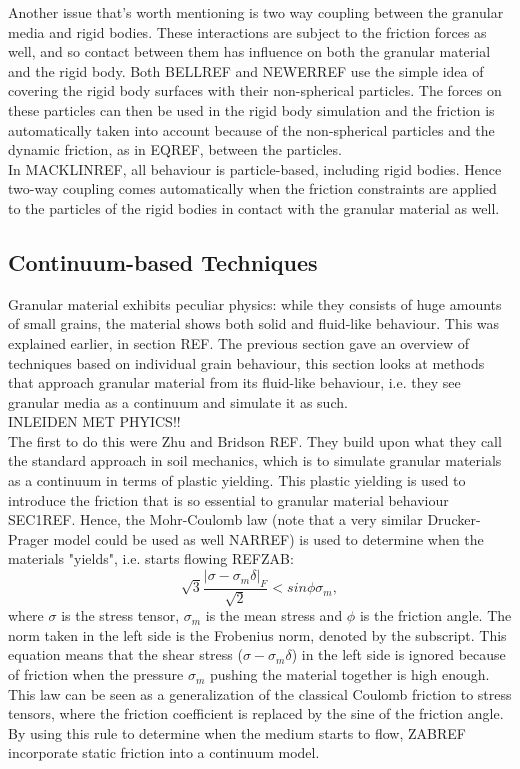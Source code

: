 Another issue that's worth mentioning is two way coupling between the granular media and rigid bodies. These interactions are subject to the friction forces as well, and so contact between them has influence on both the granular material and the rigid body. Both BELLREF and NEWERREF use the simple idea of covering the rigid body surfaces with their non-spherical particles. The forces on these particles can then be used in the rigid body simulation and the friction is automatically taken into account because of the non-spherical particles and the dynamic friction, as in EQREF, between the particles.\\

In MACKLINREF, all behaviour is particle-based, including rigid bodies. Hence two-way coupling comes automatically when the friction constraints are applied to the particles of the rigid bodies in contact with the granular material as well.


\subsection{Continuum-based Techniques}
Granular material exhibits peculiar physics: while they consists of huge amounts of small grains, the material shows both solid and fluid-like behaviour. This was explained earlier, in section REF. The previous section gave an overview of techniques based on individual grain behaviour, this section looks at methods that approach granular material from its fluid-like behaviour, i.e. they see granular media as a continuum and simulate it as such.\\

INLEIDEN MET PHYICS!!\\

The first to do this were Zhu and Bridson REF. They build upon what they call the standard approach in soil mechanics, which is to simulate granular materials as a continuum in terms of plastic yielding. This plastic yielding is used to introduce the friction that is so essential to granular material behaviour SEC1REF. Hence, the Mohr-Coulomb law (note that a very similar Drucker-Prager model could be used as well NARREF) is used to determine when the materials "yields", i.e. starts flowing REFZAB:
\begin{equation}
\sqrt{3} \frac{|\sigma - \sigma_m \delta |_F}{\sqrt{2}} < sin \phi \sigma_m,
\end{equation}
where $\sigma$ is the stress tensor, $\sigma_m$ is the mean stress and $\phi$ is the friction angle. The norm taken in the left side is the Frobenius norm, denoted by the subscript. This equation means that the shear stress ($\sigma -\sigma_m \delta$) in the left side is ignored because of friction when the pressure $\sigma_m$ pushing the material together is high enough. This law can be seen as a generalization of the classical Coulomb friction to stress tensors, where the friction coefficient is replaced by the sine of the friction angle. By using this rule to determine when the medium starts to flow, ZABREF incorporate static friction into a continuum model.\\

